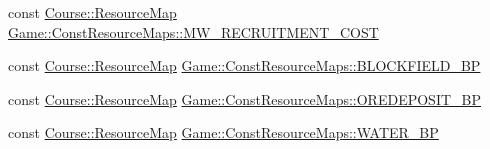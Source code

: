 \begin{DoxyCompactItemize}
\item 
const \hyperlink{namespaceCourse_ab9a46ed9cd00485e318e5731ea2f78d9}{Course\-::\-Resource\-Map} \hyperlink{namespaceGame_1_1ConstResourceMaps_ad5d316811f8c8442f6c24b5dc9134a87}{Game\-::\-Const\-Resource\-Maps\-::\-M\-W\-\_\-\-R\-E\-C\-R\-U\-I\-T\-M\-E\-N\-T\-\_\-\-C\-O\-S\-T}
\item 
const \hyperlink{namespaceCourse_ab9a46ed9cd00485e318e5731ea2f78d9}{Course\-::\-Resource\-Map} \hyperlink{namespaceGame_1_1ConstResourceMaps_aca102e5c0cc70c09b1934a785bca2b91}{Game\-::\-Const\-Resource\-Maps\-::\-B\-L\-O\-C\-K\-F\-I\-E\-L\-D\-\_\-\-B\-P}
\item 
const \hyperlink{namespaceCourse_ab9a46ed9cd00485e318e5731ea2f78d9}{Course\-::\-Resource\-Map} \hyperlink{namespaceGame_1_1ConstResourceMaps_a7b803a949c1a3e044a6a6f985928a0cc}{Game\-::\-Const\-Resource\-Maps\-::\-O\-R\-E\-D\-E\-P\-O\-S\-I\-T\-\_\-\-B\-P}
\item 
const \hyperlink{namespaceCourse_ab9a46ed9cd00485e318e5731ea2f78d9}{Course\-::\-Resource\-Map} \hyperlink{namespaceGame_1_1ConstResourceMaps_a0a964a6f0f80340d5a2d5a0a8dd0f79a}{Game\-::\-Const\-Resource\-Maps\-::\-W\-A\-T\-E\-R\-\_\-\-B\-P}
\end{DoxyCompactItemize}
